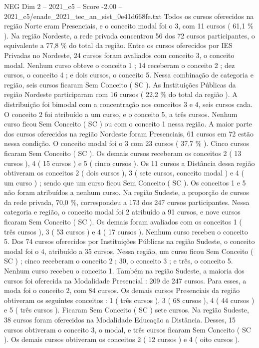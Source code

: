 \begin{textsample}{NEG Dim 2 – 2021\_c5 – Score -2.00 – 2021\_c5/enade\_2021\_tec\_an\_sist\_0e41d668fe.txt}
Todos os cursos oferecidos na região Norte eram Presenciais, e o conceito modal foi o 3, com 11 cursos ( 61,1 \% ).
Na região Nordeste, a rede privada concentrou 56 dos 72 cursos participantes, o equivalente a 77,8 \% do total da região.
Entre os cursos oferecidos por IES Privadas no Nordeste, 24 cursos foram avaliados com conceito 3, o conceito modal.
Nenhum curso obteve o conceito 1 ; 14 receberam o conceito 2 ; dez cursos, o conceito 4 ; e dois cursos, o conceito 5.
Nessa combinação de categoria e região, seis cursos ficaram Sem Conceito ( SC ).
As Instituições Públicas da região Nordeste participaram com 16 cursos ( 22,2 \% do total da região ).
A distribuição foi bimodal com a concentração nos conceitos 3 e 4, seis cursos cada.
O conceito 2 foi atribuído a um curso, e o conceito 5, a três cursos.
Nenhum curso ficou Sem Conceito ( SC ) ou com o conceito 1 nessa região.
A maior parte dos cursos oferecidos na região Nordeste foram Presenciais, 61 cursos em 72 estão nessa condição.
O conceito modal foi o 3 com 23 cursos ( 37,7 \% ).
Cinco cursos ficaram Sem Conceito ( SC ).
Os demais cursos receberam os conceitos 2 ( 13 cursos ), 4 ( 15 cursos ) e 5 ( cinco cursos ).
Os 11 cursos a Distância dessa região obtiveram os conceitos 2 ( dois cursos ), 3 ( sete cursos, conceito modal ) e 4 ( um curso ) ; sendo que um curso ficou Sem Conceito ( SC ).
Os conceitos 1 e 5 não foram atribuídos a nenhum curso.
Na região Sudeste, a proporção de cursos da rede privada, 70,0 \%, correspondeu a 173 dos 247 cursos participantes.
Nessa categoria e região, o conceito modal foi 2 atribuído a 91 cursos, e nove cursos ficaram Sem Conceito ( SC ).
Os demais foram avaliados com os conceitos 1 ( três cursos ), 3 ( 53 cursos ) e 4 ( 17 cursos ).
Nenhum curso recebeu o conceito 5.
Dos 74 cursos oferecidos por Instituições Públicas na região Sudeste, o conceito modal foi o 4, atribuído a 35 cursos.
Nessa região, um curso ficou Sem Conceito ( SC ) ; cinco receberam o conceito 2 ; 30, o conceito 3 ; e três, o conceito 5.
Nenhum curso recebeu o conceito 1.
Também na região Sudeste, a maioria dos cursos foi oferecida na Modalidade Presencial : 209 de 247 cursos.
Para esses, a moda foi o conceito 2, com 84 cursos.
Os demais cursos Presenciais da região obtiveram os seguintes conceitos : 1 ( três cursos ), 3 ( 68 cursos ), 4 ( 44 cursos ) e 5 ( três cursos ).
Ficaram Sem Conceito ( SC ) sete cursos.
Na região Sudeste, 38 cursos foram oferecidos na Modalidade Educação a Distância.
Desses, 15 cursos obtiveram o conceito 3, o modal, e três cursos ficaram Sem Conceito ( SC ).
Os demais cursos obtiveram os conceitos 2 ( 12 cursos ) e 4 ( oito cursos ).

\end{textsample}
